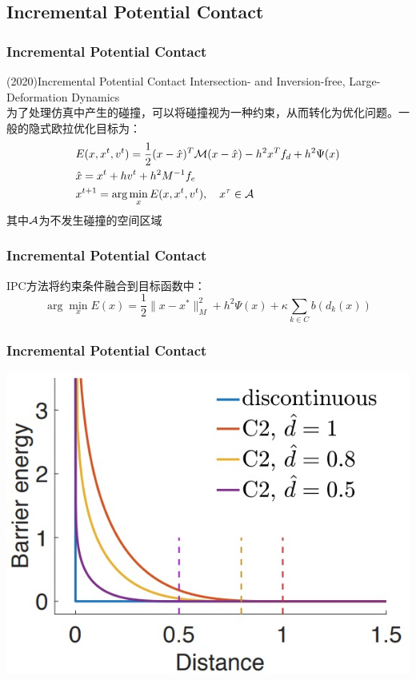 \documentclass[aspectratio=43]{ctexbeamer}
\begin{document}
\subsection{Incremental Potential Contact}
\begin{frame}
  \frametitle{Incremental Potential Contact}
	(2020)Incremental Potential Contact Intersection- and Inversion-free, Large-Deformation Dynamics\\[10pt]

		为了处理仿真中产生的碰撞，可以将碰撞视为一种约束，从而转化为优化问题。一般的隐式欧拉优化目标为：
       \begin{equation}
		\begin{split}
			&E(x,x^{t},v^{t})=\frac{1}{2}(x-\hat{x})^{T}{\cal M}(x-\hat{x})-h^{2}x^{T}f_{d}+h^{2}\Psi(x)\\
			&\hat{x}=x^{t}+h v^{t}+h^{2}M^{-1}f_{e}\\
			&x^{t+1}=\arg\operatorname*{min}_{x}E(x,x^{t},v^{t}),\quad x^{\tau}\in\cal{A}
		\end{split}
		\end{equation}
		其中$\cal{A}$为不发生碰撞的空间区域
\end{frame}

\begin{frame}
  \frametitle{Incremental Potential Contact}
		IPC方法将约束条件融合到目标函数中：
       \begin{equation}
			\arg\operatorname*{min}_{x}E(x)=\frac12\|x-x^{*}\|_{M}^{2}+h^{2}\Psi(x)+\kappa\sum_{k\in C}b(d_{k}(x))
		\end{equation}
\end{frame}

\begin{frame}
  \frametitle{Incremental Potential Contact}
        \begin{center}
            \includegraphics[width=0.7\linewidth]{./fig/障碍势能.jpg}
        \end{center}
\end{frame}
\end{document}
